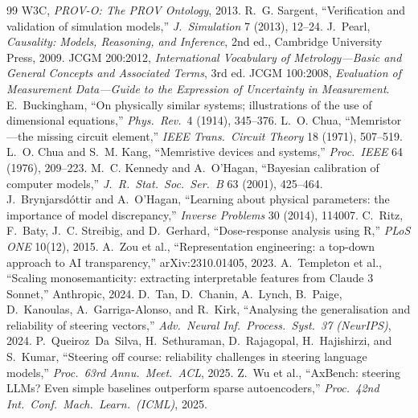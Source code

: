 \begin{thebibliography}{99}
 W3C, \emph{PROV-O: The PROV Ontology}, 2013.
 R.~G. Sargent, ``Verification and validation of simulation models,'' \emph{J.\ Simulation} 7 (2013), 12--24.
 J.~Pearl, \emph{Causality: Models, Reasoning, and Inference}, 2nd ed., Cambridge University Press, 2009.
 JCGM 200:2012, \emph{International Vocabulary of Metrology---Basic and General Concepts and Associated Terms}, 3rd ed.
 JCGM 100:2008, \emph{Evaluation of Measurement Data---Guide to the Expression of Uncertainty in Measurement}.
 E.~Buckingham, ``On physically similar systems; illustrations of the use of dimensional equations,'' \emph{Phys.\ Rev.}\ 4 (1914), 345--376.
 L.~O. Chua, ``Memristor---the missing circuit element,'' \emph{IEEE Trans.\ Circuit Theory} 18 (1971), 507--519.
 L.~O. Chua and S.~M. Kang, ``Memristive devices and systems,'' \emph{Proc.\ IEEE} 64 (1976), 209--223.
 M.~C. Kennedy and A.~O'Hagan, ``Bayesian calibration of computer models,'' \emph{J.\ R.\ Stat.\ Soc.\ Ser.~B} 63 (2001), 425--464.
 J.~Brynjarsd\'ottir and A.~O'Hagan, ``Learning about physical parameters: the importance of model discrepancy,'' \emph{Inverse Problems} 30 (2014), 114007.
 C.~Ritz, F.~Baty, J.~C. Streibig, and D.~Gerhard, ``Dose-response analysis using R,'' \emph{PLoS ONE} 10(12), 2015.
 A.~Zou et al., ``Representation engineering: a top-down approach to AI transparency,'' arXiv:2310.01405, 2023.
 A.~Templeton et al., ``Scaling monosemanticity: extracting interpretable features from Claude 3 Sonnet,'' Anthropic, 2024.
 D.~Tan, D.~Chanin, A.~Lynch, B.~Paige, D.~Kanoulas, A.~Garriga-Alonso, and R.~Kirk, ``Analysing the generalisation and reliability of steering vectors,'' \emph{Adv.\ Neural Inf.\ Process.\ Syst.\ 37 (NeurIPS)}, 2024.
 P.~Queiroz~Da~Silva, H.~Sethuraman, D.~Rajagopal, H.~Hajishirzi, and S.~Kumar, ``Steering off course: reliability challenges in steering language models,'' \emph{Proc.\ 63rd Annu.\ Meet.\ ACL}, 2025.
 Z.~Wu et al., ``AxBench: steering LLMs? Even simple baselines outperform sparse autoencoders,'' \emph{Proc.\ 42nd Int.\ Conf.\ Mach.\ Learn.\ (ICML)}, 2025.

\end{thebibliography}
